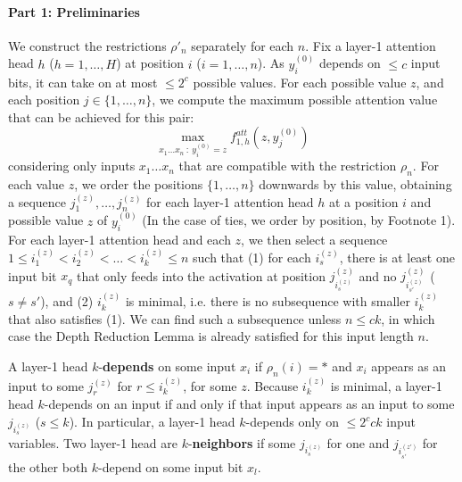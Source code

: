 \documentclass[11pt,a4paper]{article}
\begin{document}
\paragraph{Part 1: Preliminaries}
We construct the restrictions $\rho'_n$ separately for each $n$.
Fix a layer-1 attention head $h$ ($h=1,\dots, H$) at position $i$ ($i=1, \dots, n$).
As $y^{(0)}_i$ depends on $\leq c$ input bits, it can take on at most $\leq 2^c$ possible values.
For each possible value $z$,  and each position $j \in \{1, \dots, n\}$, we compute the maximum possible attention value that can be achieved for this pair:
\begin{equation}
\max_{x_1\dots x_n\ :\ y^{(0)}_i=z} f^{att}_{1,h}(z, y^{(0)}_j)
\end{equation}
considering only inputs $x_1\dots x_n$ that are compatible with the restriction $\rho_n$.
For each value $z$, we order the positions $\{1, \dots, n\}$ downwards by this value, obtaining a sequence $j_1^{(z)}, \dots, j_n^{(z)}$ for each layer-1 attention head $h$ at a position $i$ and possible value $z$ of $y^{(0)}_i$ (In the case of ties, we order by  position, by Footnote 1).
For each layer-1 attention head and each $z$, we then select a sequence $1 \leq i_1^{(z)} < i_2^{(z)} < \dots < i_{k}^{(z)} \leq n$ such that (1) for each $i_s^{(z)}$, there is at least one input bit $x_q$ that only feeds into the activation at position $j_{i_s^{(z)}}^{(z)}$ and no $j_{i_{s'}^{(z)}}^{(z)}$ ($s\neq s'$), and (2) $i_{k}^{(z)}$ is minimal, i.e. there is no subsequence with smaller $i_{k}^{(z)}$ that also satisfies (1).
We can find such a subsequence unless $n \leq ck$, in which case the Depth Reduction Lemma is already satisfied for this input length $n$.

A layer-1 head $k$-\textbf{depends} on some input $x_i$ if $\rho_n(i) = *$ and $x_i$ appears as an input to some $j_r^{(z)}$ for $r \leq i_k^{(z)}$, for some $z$.
Because $i_k^{(z)}$ is minimal, a layer-1 head $k$-depends on an input if and only if that input appears as an input to some $j_{i_s^{(z)}}$ ($s \leq k$).
In particular, a layer-1 head $k$-depends only on $\leq 2^c ck$ input variables.
Two layer-1 head are $k$-\textbf{neighbors} if some $j_{i_s^{(z)}}$ for one and $j_{i_{s'}^{(z')}}$ for the other both $k$-depend on some input bit $x_l$.
\end{document}
